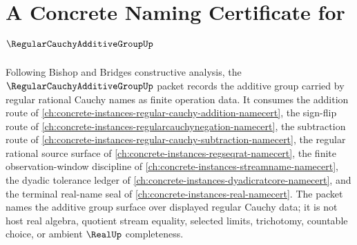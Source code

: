 \chapter{A Concrete Naming Certificate for $\RegularCauchyAdditiveGroupUp$}
\label{ch:concrete-instances-regular-cauchy-additive-group-namecert}

Following Bishop and Bridges constructive analysis, the $\RegularCauchyAdditiveGroupUp$ packet records the additive group carried by regular rational Cauchy names as finite operation data. It consumes the addition route of \autoref{ch:concrete-instances-regular-cauchy-addition-namecert}, the sign-flip route of \autoref{ch:concrete-instances-regularcauchynegation-namecert}, the subtraction route of \autoref{ch:concrete-instances-regular-cauchy-subtraction-namecert}, the regular rational source surface of \autoref{ch:concrete-instances-regseqrat-namecert}, the finite observation-window discipline of \autoref{ch:concrete-instances-streamname-namecert}, the dyadic tolerance ledger of \autoref{ch:concrete-instances-dyadicratcore-namecert}, and the terminal real-name seal of \autoref{ch:concrete-instances-real-namecert}. The packet names the additive group surface over displayed regular Cauchy data; it is not host real algebra, quotient stream equality, selected limits, trichotomy, countable choice, or ambient $\RealUp$ completeness.


